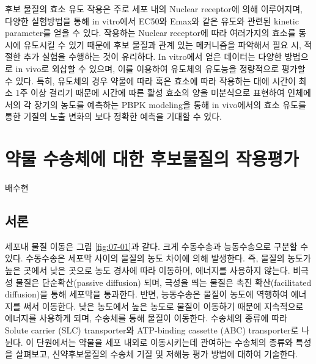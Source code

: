 \documentclass[
  11pt,
  krantz2, a4paper, twoside]{krantz}
\begin{document}
후보 물질의 효소 유도 작용은 주로 세포 내의 Nuclear receptor에 의해
이루어지며, 다양한 실험방법을 통해 in vitro에서 EC50와 Emax와 같은 유도와
관련된 kinetic parameter를 얻을 수 있다. 작용하는 Nuclear receptor에 따라
여러가지의 효소를 동시에 유도시킬 수 있기 때문에 후보 물질과 관계 있는 메커니즘을 파악해서
필요 시, 적절한 추가 실험을 수행하는 것이 유리하다. In vitro에서 얻은 데이터는 다양한 방법으로
in vivo로 외삽할 수 있으며, 이를 이용하여 유도체의 유도능을 정량적으로 평가할 수 있다.
특히, 유도체의 경우 약물에 따라 혹은 효소에 따라 작용하는 대에 시간이 최소 1주 이상 걸리기 때문에
시간에 따른 활성 효소의 양을 미분식으로 표현하여 인체에서의 각 장기의 농도를 예측하는 PBPK modeling을
통해 in vivo에서의 효소 유도를 통한 기질의 노출 변화의 보다 정확한 예측을 기대할 수 있다.

\chapter{약물 수송체에 대한 후보물질의 작용평가}\label{uxc57duxbb3c-uxc218uxc1a1uxccb4uxc5d0-uxb300uxd55c-uxd6c4uxbcf4uxbb3cuxc9c8uxc758-uxc791uxc6a9uxd3c9uxac00}

\Large\hfill

배수현 \normalsize

\section{서론}\label{uxc11cuxb860-6}

세포내 물질 이동은 그림 \ref{fig:07-01}과 같다. 크게 수동수송과
능동수송으로 구분할 수 있다. 수동수송은 세포막 사이의 물질의 농도 차이에
의해 발생한다. 즉, 물질의 농도가 높은 곳에서 낮은 곳으로 농도 경사에
따라 이동하며, 에너지를 사용하지 않는다. 비극성 물질은 단순확산(passive
diffusion) 되며, 극성을 띄는 물질은 촉진 확산(facilitated diffusion)을
통해 세포막을 통과한다. 반면, 능동수송은 물질이 농도에 역행하여 에너지를
써서 이동한다. 낮은 농도에서 높은 농도로 물질이 이동하기 때문에
지속적으로 에너지를 사용하게 되며, 수송체를 통해 물질이 이동한다.
수송체의 종류에 따라 Solute carrier (SLC) transporter와 ATP-binding
cassette (ABC) transporter로 나뉜다. 이 단원에서는 약물을 세포 내외로
이동시키는데 관여하는 수송체의 종류와 특성을 살펴보고, 신약후보물질의
수송체 기질 및 저해능 평가 방법에 대하여 기술한다.
\end{document}
